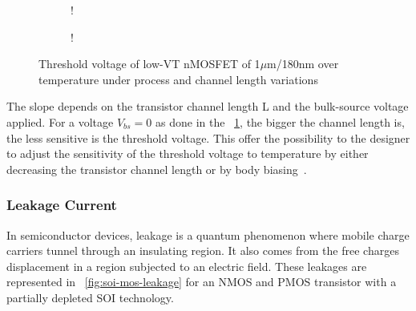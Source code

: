 \begin{figure}[!ht]
	\centering
	\begin{subfigure}[b]{0.48\textwidth}
		\resizebox {\textwidth} {!} {
			
		}
	\end{subfigure}
	\begin{subfigure}[b]{0.48\textwidth}
		\resizebox {\textwidth} {!} {
			
		}
		\label{fig:vth_nel_L}
	\end{subfigure}
	\caption{Threshold voltage of low-VT nMOSFET of 1\(\mu \)m/180nm over temperature under process and channel length variations}
	\label{fig:vth_nel}
\end{figure}

The slope depends on the transistor channel length L and the bulk-source voltage applied. For a voltage \(V_{bs} = 0 \) as done in the \figurename~\ref{fig:vth_nel_L}, the bigger the channel length is, the less sensitive is the threshold voltage. This offer the possibility to the designer to adjust the sensitivity of the threshold voltage to temperature by either decreasing the transistor channel length or by body biasing~\cite{Kumar2008}.


\subsubsection{Leakage Current}        %
In semiconductor devices, leakage is a quantum phenomenon where mobile charge carriers tunnel through an insulating region. It also comes from the free charges displacement in a region subjected to an electric field. These leakages are represented in \figurename~\ref{fig:soi-mos-leakage} for an NMOS and PMOS transistor with a partially depleted SOI technology.

